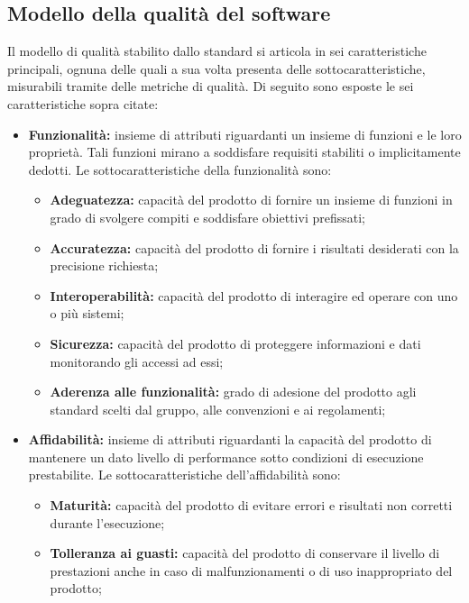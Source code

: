 \subsection{Modello della qualità del software} \label{subsection:modello_qualitaSW}
Il modello di qualità stabilito dallo standard si articola in sei caratteristiche principali, ognuna delle quali a sua volta presenta delle sottocaratteristiche, misurabili tramite delle metriche di qualità.
Di seguito sono esposte le sei caratteristiche sopra citate:
\begin{itemize}
    \item \textbf{Funzionalità:} insieme di attributi riguardanti un insieme di funzioni e le loro proprietà.
          Tali funzioni mirano a soddisfare requisiti stabiliti o implicitamente dedotti.
          Le sottocaratteristiche della funzionalità sono:
          \begin{itemize}
              \item \textbf{Adeguatezza:} capacità del prodotto di fornire un insieme di funzioni in grado di svolgere compiti e soddisfare obiettivi prefissati;
              \item \textbf{Accuratezza:} capacità del prodotto di fornire i risultati desiderati con la precisione richiesta;
              \item \textbf{Interoperabilità:} capacità del prodotto di interagire ed operare con uno o più sistemi;
              \item \textbf{Sicurezza:} capacità del prodotto di proteggere informazioni e dati monitorando gli accessi ad essi;
              \item \textbf{Aderenza alle funzionalità:} grado di adesione del prodotto agli standard scelti dal gruppo, alle convenzioni e ai regolamenti;
          \end{itemize}
    \item \textbf{Affidabilità:} insieme di attributi riguardanti la capacità del prodotto di mantenere un dato livello di performance sotto condizioni di esecuzione prestabilite.
          Le sottocaratteristiche dell'affidabilità sono:
          \begin{itemize}
              \item \textbf{Maturità:} capacità del prodotto di evitare errori e risultati non corretti durante l'esecuzione;
              \item \textbf{Tolleranza ai guasti:} capacità del prodotto di conservare il livello di prestazioni anche in caso di malfunzionamenti o di uso inappropriato del prodotto;

\end{itemize}
\end{itemize}
